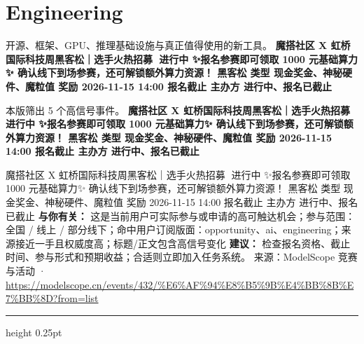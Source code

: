 \documentclass[10.5pt]{ctexart}
\begin{document}
\section*{Engineering}
{\color{ormuted} 开源、框架、GPU、推理基础设施与真正值得使用的新工具。}
\vspace{2mm}
{\LARGE\bfseries 魔搭社区 X 虹桥国际科技周黑客松｜选手火热招募🚀 进行中 ✨报名参赛即可领取 1000 元基础算力✨ 确认线下到场参赛，还可解锁额外算力资源！ 黑客松 类型 现金奖金、神秘硬件、魔粒值 奖励 2026-11-15 14:00 报名截止 主办方 进行中、报名已截止}\par
\vspace{1mm}
{\color{ormuted} 本版筛出 5 个高信号事件。}
\vspace{3mm}
{\Large\bfseries 魔搭社区 X 虹桥国际科技周黑客松｜选手火热招募🚀 进行中 ✨报名参赛即可领取 1000 元基础算力✨ 确认线下到场参赛，还可解锁额外算力资源！ 黑客松 类型 现金奖金、神秘硬件、魔粒值 奖励 2026-11-15 14:00 报名截止 主办方 进行中、报名已截止}\par
魔搭社区 X 虹桥国际科技周黑客松｜选手火热招募🚀 进行中 ✨报名参赛即可领取 1000 元基础算力✨ 确认线下到场参赛，还可解锁额外算力资源！ 黑客松 类型 现金奖金、神秘硬件、魔粒值 奖励 2026-11-15 14:00 报名截止 主办方 进行中、报名已截止
\textbf{与你有关：} 这是当前用户可实际参与或申请的高可触达机会；参与范围：全国 / 线上 / 部分线下；命中用户订阅版面：opportunity、ai、engineering；来源接近一手且权威度高；标题/正文包含高信号变化
\textbf{建议：} 检查报名资格、截止时间、参与形式和预期收益；合适则立即加入任务系统。
{\footnotesize\color{ormuted} 来源：ModelScope 竞赛与活动 · \url{https://modelscope.cn/events/432/%E6%AF%94%E8%B5%9B%E4%BB%8B%E7%BB%8D?from=list}}
\vspace{4mm}
\hrule height 0.25pt
\vspace{3mm}
\end{document}
